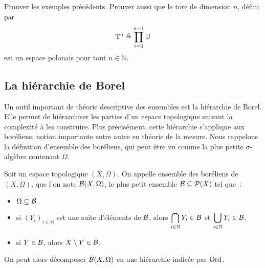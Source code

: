 \begin{exercise}
  Prouver les exemples précédents. Prouver aussi que le tore de dimension $n$,
  défini par
  \[\mathbb T^n \triangleq \prod_{i = 0}^{n-1} \mathbb U\]
  est un espace polonais pour tout $n \in \mathbb N$.
\end{exercise}

\subsection{La hiérarchie de Borel}

Un outil important de théorie descriptive des ensembles est la hiérarchie de
Borel. Elle permet de hiérarchiser les parties d'un espace topologique suivant
la complexité à les construire. Plus précisément, cette hiérarchie s'applique
aux boréliens, notion importante entre autre en théorie de la mesure. Nous
rappelons la définition d'ensemble des boréliens, qui peut être vu comme la plus
petite $\sigma$-algèbre contenant $\Omega$.

\begin{definition}
  Soit un espace topologique $(X,\Omega)$. On appelle ensemble des boréliens de
  $(X,\Omega)$, que l'on note $\mathcal{B}(X,\Omega)$, le plus petit ensemble
  $\mathcal{B}\subseteq \mathcal{P}(X)$ tel que~:
  \begin{itemize}
  \item $\Omega\subseteq \mathcal{B}$
  \item si $(Y_i)_{i\in\mathbb N}$ est une suite d'éléments de $\mathcal{B}$, alors
    $\displaystyle\bigcap_{i\in\mathbb N} Y_i\in \mathcal{B}$ et
    $\displaystyle\bigcup_{i\in\mathbb N} Y_i\in\mathcal{B}$.
  \item si $Y\in\mathcal{B}$, alors $X\setminus Y \in \mathcal{B}$.
  \end{itemize}
\end{definition}

On peut alors décomposer $\mathcal{B}(X,\Omega)$ en une hiérarchie indicée par
$\operatorname{Ord}$.

